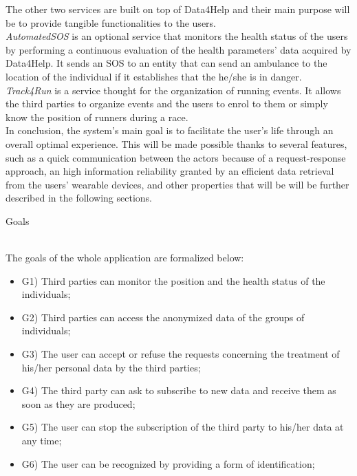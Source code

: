 \documentclass{article}
\begin{document}
\begin{legal}
\begin{legal}
\begin{legal}
{The other two services are built on top of Data4Help and their main purpose will be to provide tangible functionalities to the users.\\
\textit{AutomatedSOS }is an optional service that monitors the health status of the users by performing a continuous evaluation of the health parameters' data acquired by Data4Help. It sends an SOS to an entity that can send an ambulance to the location of the individual if it establishes that the he/she is in danger.\\
\textit{Track4Run} is a service thought for the organization of running events. It allows the third parties to organize events and the users to enrol to them or simply know the position of runners during a race.\\
In conclusion, the system's main goal is to facilitate the user's life through an overall optimal experience. This will be made possible thanks to several features, such as a quick communication between the actors because of a request-response approach, an high information reliability granted by an efficient data retrieval from the users' wearable devices, and other properties that will be will be further described in the following sections.
			}\\
			\item Goals \\\\
			{\normalfont
			The goals of the whole application are formalized below:\\
				\begin{itemize}
				\item G1) Third parties can monitor the position and the health status of the individuals;\\
				\item G2) Third parties can access the anonymized data of the groups of individuals;\\
				\item G3) The user can accept or refuse the requests concerning the treatment of his/her personal data by the third parties;\\
				\item G4) The third party can ask to subscribe to new data and receive them as soon as they are produced;\\
				\item G5) The user can stop the subscription of the third party to his/her data at any time;\\
				\item G6) The user can be recognized by providing a form of identification;\\

\end{itemize}}
\end{legal}
\end{legal}
\end{legal}
\end{document}
